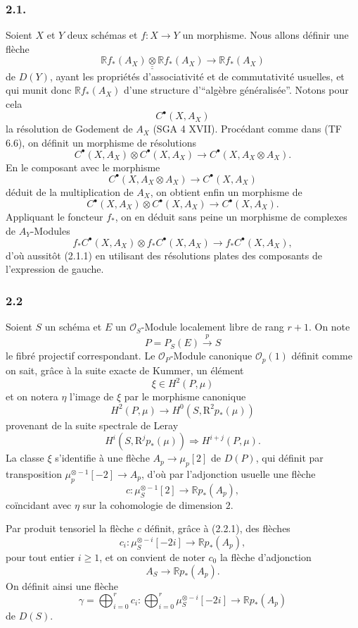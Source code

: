 \documentclass[11pt]{article}
\newcommand{\R}{\mathbb{R}}\newcommand{\RHomCore}{\mathbb{R}\mathrm{Hom}}
\providecommand{\R}{\mathrm R}
\begin{document}
\subsubsection*{2.1.}
Soient $X$ et $Y$ deux schémas et $f:X\to Y$ un morphisme. Nous allons définir une flèche
\[
\R f_*(A_X)\mathbin{\underline{\underline{\otimes}}} \R f_*(A_X)\longrightarrow \R f_*(A_X)
\tag{2.1.1}
\]
de $D(Y)$, ayant les propriétés d'associativité et de commutativité usuelles, et qui munit donc $\R f_*(A_X)$ d'une structure d'``algèbre généralisée''. Notons pour cela
\[
C^{\bullet}(X,A_X)
\]
la
résolution de Godement de $A_X$ (SGA 4 XVII). Procédant comme dans (TF 6.6), on définit un morphisme de résolutions
\[
C^{\bullet}(X,A_X)\otimes C^{\bullet}(X,A_X)\longrightarrow C^{\bullet}(X,A_X\otimes A_X).
\]
En le composant avec le morphisme
\[
C^{\bullet}(X,A_X\otimes A_X)\longrightarrow C^{\bullet}(X,A_X)
\]
déduit de la multiplication de $A_X$, on obtient enfin un morphisme de
\[
C^{\bullet}(X,A_X)\otimes C^{\bullet}(X,A_X)\longrightarrow C^{\bullet}(X,A_X).
\tag{2.1.2}
\]
Appliquant le foncteur $f_*$, on en déduit sans peine un morphisme de complexes de $A_Y$-Modules
\[
f_*C^{\bullet}(X,A_X)\otimes f_*C^{\bullet}(X,A_X)\longrightarrow f_*C^{\bullet}(X,A_X),
\]
d'où aussitôt (2.1.1) en utilisant des résolutions plates des composants de l'expression de gauche.

\subsubsection*{2.2}
Soient $S$ un schéma et $E$ un $\mathcal O_S$-Module localement libre de rang $r+1$. On note
\[
P=P_S(E)\xrightarrow{p}S
\]
le fibré projectif correspondant. Le $\mathcal O_P$-Module canonique $\mathcal O_p(1)$ définit comme on sait, grâce à la suite exacte de Kummer, un élément
\[
\xi\in H^2(P,\mu)
\]
et on notera $\eta$ l'image de $\xi$ par le morphisme canonique
\[
H^2(P,\mu)\longrightarrow H^0(S,\mathrm{R}^2p_*(\mu))
\]
provenant de la suite spectrale de Leray
\[
H^i(S,\mathrm{R}^jp_*(\mu))\Rightarrow H^{i+j}(P,\mu).
\]
La classe $\xi$ s'identifie à une flèche $A_p\to\mu_p[2]$ de $D(P)$, qui définit par transposition $\mu_p^{\otimes -1}[-2]\to A_p$, d'où par l'adjonction usuelle une flèche
\[
c:\mu_S^{\otimes -1}[2]\longrightarrow \R p_*(A_p),
\]
coïncidant avec $\eta$ sur la cohomologie de dimension $2$.

Par
produit tensoriel la flèche $c$ définit, grâce à (2.2.1), des flèches
\[
c_i:\mu_S^{\otimes -i}[-2i]\longrightarrow \R p_*(A_p),
\]
pour tout entier $i\ge1$, et on convient de noter $c_0$ la flèche d'adjonction
\[
A_S\longrightarrow \R p_*(A_p).
\]
On définit ainsi une flèche
\[
\gamma=\bigoplus_{i=0}^{r}c_i:
\bigoplus_{i=0}^{r}\mu_S^{\otimes -i}[-2i]\longrightarrow \R p_*(A_p)
\]
de $D(S)$.
\end{document}
